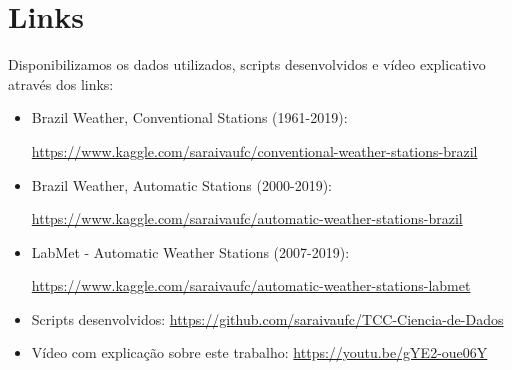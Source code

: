 \chapter{Links}

Disponibilizamos os dados utilizados, scripts desenvolvidos e vídeo explicativo através dos links: 

\begin{itemize}
    \item Brazil Weather, Conventional Stations (1961-2019):
    
    \href{https://www.kaggle.com/saraivaufc/conventional-weather-stations-brazil}{https://www.kaggle.com/saraivaufc/conventional-weather-stations-brazil}
    
    \item Brazil Weather, Automatic Stations (2000-2019):
    
    \href{https://www.kaggle.com/saraivaufc/automatic-weather-stations-brazil}{https://www.kaggle.com/saraivaufc/automatic-weather-stations-brazil}
    
    \item LabMet - Automatic Weather Stations (2007-2019):
    
    \href{https://www.kaggle.com/saraivaufc/automatic-weather-stations-labmet}{https://www.kaggle.com/saraivaufc/automatic-weather-stations-labmet}
    
    \item Scripts desenvolvidos: \href{https://github.com/saraivaufc/TCC-Ciencia-de-Dados}{https://github.com/saraivaufc/TCC-Ciencia-de-Dados}
    
    \item Vídeo com explicação sobre este trabalho: \href{https://youtu.be/gYE2-oue06Y}{https://youtu.be/gYE2-oue06Y}
\end{itemize}


\newpage